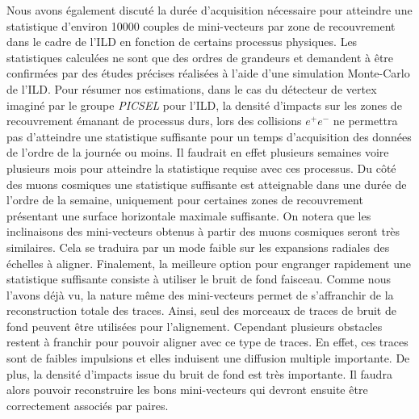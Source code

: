  Nous avons \'egalement discut\'e la dur\'ee d'acquisition n\'ecessaire pour atteindre une statistique d'environ 10000 couples de mini-vecteurs par zone de recouvrement dans le cadre de l'ILD en fonction de certains processus physiques. Les statistiques calcul\'ees ne sont que des ordres de grandeurs et demandent \`a \^etre confirm\'ees par des \'etudes pr\'ecises r\'ealis\'ees \`a l'aide d'une simulation Monte-Carlo de l'ILD. Pour r\'esumer nos estimations, dans le cas du détecteur de vertex imagin\'e par le groupe \textit{PICSEL} pour l'ILD, la densit\'e d'impacts sur les zones de recouvrement \'emanant de processus durs, lors des collisions $e^+ e^-$ ne permettra pas d'atteindre une statistique suffisante pour un temps d'acquisition des donn\'ees de l'ordre de la journ\'ee ou moins. Il faudrait en effet plusieurs semaines voire plusieurs mois pour atteindre la statistique requise avec ces processus. Du côt\'e des muons cosmiques une statistique suffisante est atteignable dans une dur\'ee de l'ordre de la semaine, uniquement pour certaines zones de recouvrement pr\'esentant une surface horizontale maximale suffisante. On notera que les inclinaisons des mini-vecteurs obtenus \`a partir des muons cosmiques seront tr\`es similaires. Cela se traduira par un mode faible sur les expansions radiales des \'echelles \`a aligner. Finalement, la meilleure option pour engranger rapidement une statistique suffisante consiste \`a utiliser le bruit de fond faisceau. Comme nous l'avons déjà vu, la nature m\^eme des mini-vecteurs permet de s'affranchir de la reconstruction totale des traces. Ainsi, seul des morceaux de traces de bruit de fond peuvent \^etre utilis\'ees pour l'alignement. Cependant plusieurs obstacles restent \`a franchir pour pouvoir aligner avec ce type de traces. En effet, ces traces sont de faibles impulsions et elles induisent une diffusion multiple importante. De plus, la densit\'e d'impacts issue du bruit de fond est tr\`es importante. Il faudra alors pouvoir reconstruire les bons mini-vecteurs qui devront ensuite \^etre correctement associ\'es par paires.
    
  \medskip
  
